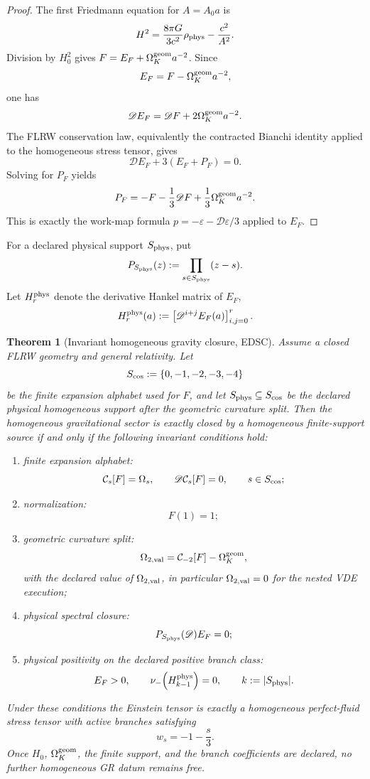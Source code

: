 \documentclass[aps,prd,preprint,onecolumn,nofootinbib,superscriptaddress,showkeys]{revtex4-2}
\numberwithin{equation}{section}
\theoremstyle{definition}
\theoremstyle{plain}
\newtheorem{theorem}{Theorem}[section]
\newcommand{\Dil}{\mathscr D}
\begin{document}
\begin{proof}
The first Friedmann equation for \(A=A_0a\) is
\[
H^2=\frac{8\pi G}{3c^2}\rho_{\rm phys}-\frac{c^2}{A^2}.
\]
Division by \(H_0^2\) gives \(F=E_F+\Omega_K^{\rm geom}a^{-2}\).  Since
\[
E_F=F-\Omega_K^{\rm geom}a^{-2},
\]
one has
\[
\Dil E_F=\Dil F+2\Omega_K^{\rm geom}a^{-2}.
\]
The FLRW conservation law, equivalently the contracted Bianchi identity applied to the homogeneous stress tensor, gives
\[
\Dil E_F+3(E_F+P_F)=0.
\]
Solving for \(P_F\) yields
\[
P_F=-F-\frac13\Dil F+\frac13\Omega_K^{\rm geom}a^{-2}.
\]
This is exactly the work-map formula \(p=-\varepsilon-\Dil\varepsilon/3\) applied to \(E_F\).
\end{proof}

For a declared physical support \(S_{\rm phys}\), put
\begin{equation}
P_{S_{\rm phys}}(z):=\prod_{s\in S_{\rm phys}}(z-s).
\end{equation}
Let \(H_r^{\rm phys}\) denote the derivative Hankel matrix of \(E_F\),
\begin{equation}
H_r^{\rm phys}(a):=\left[\Dil^{i+j}E_F(a)\right]_{i,j=0}^{r}.
\end{equation}

\begin{theorem}[Invariant homogeneous gravity closure, EDSC]\label{thm:gravity-closure}
Assume a closed FLRW geometry and general relativity.  Let
\[
S_{\rm cos}:=\{0,-1,-2,-3,-4\}
\]
be the finite expansion alphabet used for \(F\), and let \(S_{\rm phys}\subseteq S_{\rm cos}\) be the declared physical homogeneous support after the geometric curvature split.  Then the homogeneous gravitational sector is exactly closed by a homogeneous finite-support source if and only if the following invariant conditions hold:
\begin{enumerate}
\item finite expansion alphabet:
\[
\mathcal C_s[F]=\Omega_s,
\qquad
\Dil\mathcal C_s[F]=0,
\qquad
s\in S_{\rm cos};
\]
\item normalization:
\[
F(1)=1;
\]
\item geometric curvature split:
\[
\Omega_{2,{\rm val}}
=
\mathcal C_{-2}[F]-\Omega_K^{\rm geom},
\]
with the declared value of \(\Omega_{2,{\rm val}}\), in particular \(\Omega_{2,{\rm val}}=0\) for the nested VDE execution;
\item physical spectral closure:
\[
P_{S_{\rm phys}}(\Dil)E_F=0;
\]
\item physical positivity on the declared positive branch class:
\[
E_F>0,
\qquad
\nu_-\!\left(H_{k-1}^{\rm phys}\right)=0,
\qquad
k:=|S_{\rm phys}|.
\]
\end{enumerate}
Under these conditions the Einstein tensor is exactly a homogeneous perfect-fluid stress tensor with active branches satisfying
\begin{equation}
w_s=-1-\frac{s}{3}.
\end{equation}
Once \(H_0\), \(\Omega_K^{\rm geom}\), the finite support, and the branch coefficients are declared, no further homogeneous GR datum remains free.
\end{theorem}
\end{document}
